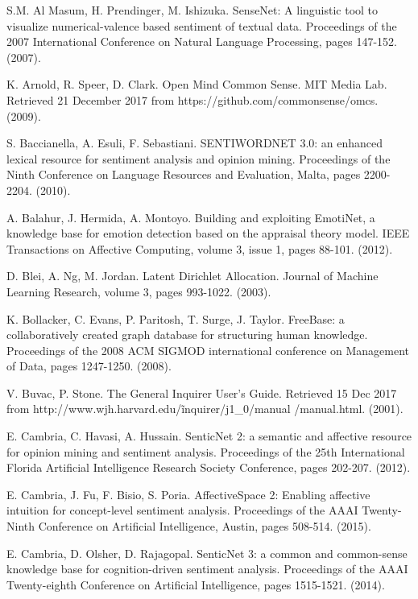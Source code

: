 \documentclass[letterpaper, 10 pt, conference]{ieeeconf}
\begin{document}
\begin{thebibliography}{99}

 S.M. Al Masum, H. Prendinger, M. Ishizuka. SenseNet: A linguistic tool to visualize numerical-valence based sentiment of textual data. Proceedings of the 2007 International Conference on Natural Language Processing, pages 147-152. (2007).

 K. Arnold, R. Speer, D. Clark. Open Mind Common Sense. MIT Media Lab. Retrieved 21 December 2017 from https://github.com/commonsense/omcs. (2009).

 S. Baccianella, A. Esuli, F. Sebastiani. SENTIWORDNET 3.0: an enhanced lexical resource for sentiment analysis and opinion mining. Proceedings of the Ninth Conference on Language Resources and Evaluation, Malta, pages 2200-2204. (2010).

 A. Balahur, J. Hermida, A. Montoyo. Building and exploiting EmotiNet, a knowledge base for emotion detection based on the appraisal theory model. IEEE Transactions on Affective Computing, volume 3, issue 1, pages 88-101. (2012).

 D. Blei, A. Ng, M. Jordan. Latent Dirichlet Allocation. Journal of Machine Learning Research, volume 3, pages 993-1022. (2003).

 K. Bollacker, C. Evans, P. Paritosh, T. Surge, J. Taylor. FreeBase: a collaboratively created graph database for structuring human knowledge. Proceedings of the 2008 ACM SIGMOD international conference on Management of Data, pages 1247-1250. (2008).

 V. Buvac, P. Stone. The General Inquirer User's Guide. Retrieved 15 Dec 2017 from http://www.wjh.harvard.edu/\~inquirer/j1\_0/manual /manual.html. (2001).

 E. Cambria, C. Havasi, A. Hussain. SenticNet 2: a semantic and affective resource for opinion mining and sentiment analysis. Proceedings of the 25th International Florida Artificial Intelligence Research Society Conference, pages 202-207. (2012).

 E. Cambria, J. Fu, F. Bisio, S. Poria. AffectiveSpace 2: Enabling affective intuition for concept-level sentiment analysis. Proceedings of the AAAI Twenty-Ninth Conference on Artificial Intelligence, Austin, pages 508-514. (2015).

 E. Cambria, D. Olsher, D. Rajagopal. SenticNet 3: a common and common-sense knowledge base for cognition-driven sentiment analysis. Proceedings of the AAAI Twenty-eighth Conference on Artificial Intelligence, pages 1515-1521. (2014).


\end{thebibliography}
\end{document}
